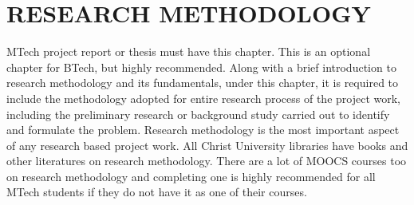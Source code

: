 \chapter{RESEARCH METHODOLOGY} 
\label{ChapterResearchMethodology} 


MTech project report or thesis must have this chapter. This is an optional chapter for BTech, but highly recommended. 
Along with a brief introduction to research methodology and its fundamentals, under this chapter, it is required to include the methodology adopted for entire research process of the project work, including the preliminary research or background study carried out to identify and formulate the problem. 
Research methodology is the most important aspect of any research based project work. All Christ University libraries have books and other literatures on research methodology. There are a lot of MOOCS courses too on research methodology and completing one is highly recommended for all MTech students if they do not have it as one of their courses. 



		



